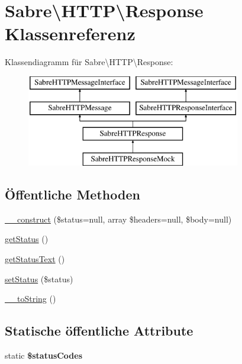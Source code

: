\hypertarget{class_sabre_1_1_h_t_t_p_1_1_response}{}\section{Sabre\textbackslash{}H\+T\+TP\textbackslash{}Response Klassenreferenz}
\label{class_sabre_1_1_h_t_t_p_1_1_response}
Klassendiagramm für Sabre\textbackslash{}H\+T\+TP\textbackslash{}Response\+:\begin{figure}[H]
\begin{center}
\leavevmode
\includegraphics[height=4.000000cm]{class_sabre_1_1_h_t_t_p_1_1_response}
\end{center}
\end{figure}
\subsection*{Öffentliche Methoden}
\begin{DoxyCompactItemize}
\item 
\mbox{\hyperlink{class_sabre_1_1_h_t_t_p_1_1_response_ab63feaf0e0ae3fb2bed0439a1c556777}{\+\_\+\+\_\+construct}} (\$status=null, array \$headers=null, \$body=null)
\item 
\mbox{\hyperlink{class_sabre_1_1_h_t_t_p_1_1_response_afe2cf93ce624d99a248a1aaf6bd2986b}{get\+Status}} ()
\item 
\mbox{\hyperlink{class_sabre_1_1_h_t_t_p_1_1_response_af303e7bec58ea83086d1b7fe6cd7060d}{get\+Status\+Text}} ()
\item 
\mbox{\hyperlink{class_sabre_1_1_h_t_t_p_1_1_response_aa2f393e4e475f4b6019b7add7a99be86}{set\+Status}} (\$status)
\item 
\mbox{\hyperlink{class_sabre_1_1_h_t_t_p_1_1_response_af5e87462ff6700f9d70f19f44c110ecd}{\+\_\+\+\_\+to\+String}} ()
\end{DoxyCompactItemize}
\subsection*{Statische öffentliche Attribute}
\begin{DoxyCompactItemize}
\item 
static {\bfseries \$status\+Codes}
\end{DoxyCompactItemize}
